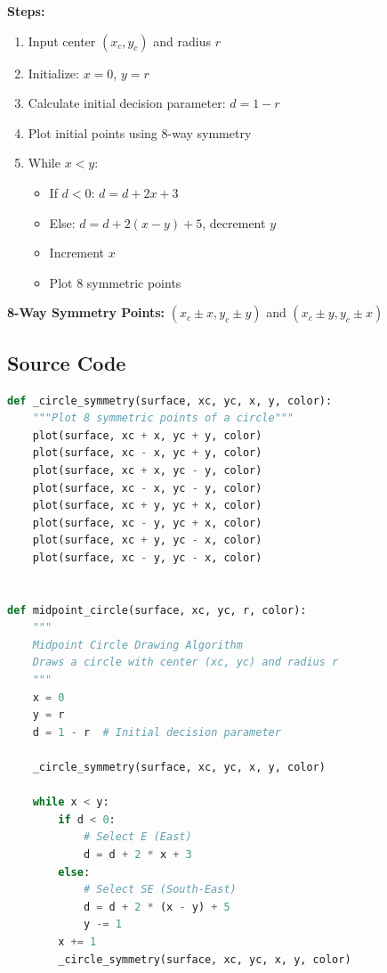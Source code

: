 \documentclass[12pt,a4paper]{article}
\begin{document}
\textbf{Steps:}
\begin{enumerate}
    \item Input center $(x_c, y_c)$ and radius $r$
    \item Initialize: $x = 0$, $y = r$
    \item Calculate initial decision parameter: $d = 1 - r$
    \item Plot initial points using 8-way symmetry
    \item While $x < y$:
    \begin{itemize}
        \item If $d < 0$: $d = d + 2x + 3$
        \item Else: $d = d + 2(x - y) + 5$, decrement $y$
        \item Increment $x$
        \item Plot 8 symmetric points
    \end{itemize}
\end{enumerate}

\textbf{8-Way Symmetry Points:}
$(x_c \pm x, y_c \pm y)$ and $(x_c \pm y, y_c \pm x)$

\subsection{Source Code}
\begin{lstlisting}[language=Python, caption=Midpoint Circle Drawing Algorithm]
def _circle_symmetry(surface, xc, yc, x, y, color):
    """Plot 8 symmetric points of a circle"""
    plot(surface, xc + x, yc + y, color)
    plot(surface, xc - x, yc + y, color)
    plot(surface, xc + x, yc - y, color)
    plot(surface, xc - x, yc - y, color)
    plot(surface, xc + y, yc + x, color)
    plot(surface, xc - y, yc + x, color)
    plot(surface, xc + y, yc - x, color)
    plot(surface, xc - y, yc - x, color)


def midpoint_circle(surface, xc, yc, r, color):
    """
    Midpoint Circle Drawing Algorithm
    Draws a circle with center (xc, yc) and radius r
    """
    x = 0
    y = r
    d = 1 - r  # Initial decision parameter
    
    _circle_symmetry(surface, xc, yc, x, y, color)
    
    while x < y:
        if d < 0:
            # Select E (East)
            d = d + 2 * x + 3
        else:
            # Select SE (South-East)
            d = d + 2 * (x - y) + 5
            y -= 1
        x += 1
        _circle_symmetry(surface, xc, yc, x, y, color)
\end{lstlisting}
\end{document}
